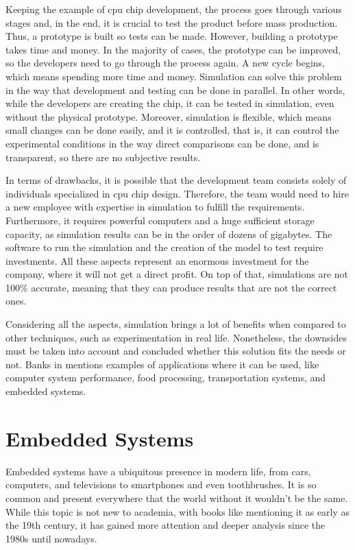 Keeping the example of \gls{cpu} chip development, the process goes through various stages and, in the end, it is crucial to test the product 
before mass production. Thus, a prototype is built so tests can be made. However, building a prototype takes time and money. In the majority of 
cases, the prototype can be improved, so the developers need to go through the process again. A new cycle begins, which means spending more time 
and money. Simulation can solve this problem in the way that development and testing can be done in parallel. In other words, while the developers 
are creating the chip, it can be tested in simulation, even without the physical prototype. Moreover, simulation is flexible, which means small 
changes can be done easily, and it is controlled, that is, it can control the experimental conditions in the way direct comparisons can be done, 
and is transparent, so there are no subjective results.

In terms of drawbacks, it is possible that the development team consists solely of individuals specialized in \gls{cpu} chip design. Therefore, 
the team would need to hire a new employee with expertise in simulation to fulfill the requirements. Furthermore, it requires powerful computers 
and a huge sufficient storage capacity, as simulation results can be in the order of dozens of gigabytes. The software to run the simulation and 
the creation of the model to test require investments. All these aspects represent an enormous investment for the company, where it will not get 
a direct profit. On top of that, simulations are not 100\% accurate, meaning that they can produce results that are not the correct ones.

Considering all the aspects, simulation brings a lot of benefits when compared to other techniques, such as experimentation in real life. 
Nonetheless, the downsides must be taken into account and concluded whether this solution fits the needs or not. Banks in 
\cite{BanksDiscreteSimulation} mentions examples of applications where it can be used, like computer system performance, food processing, 
transportation systems, and embedded systems.


\section{Embedded Systems}

Embedded systems have a ubiquitous presence in modern life, from cars, computers, and televisions to smartphones and even toothbrushes. It is 
so common and present everywhere that the world without it wouldn't be the same. While this topic is not new to academia, with books like 
\cite{banks1999introduction} mentioning it as early as the 19th century, it has gained more attention and deeper analysis since the 1980s until 
nowadays. 

